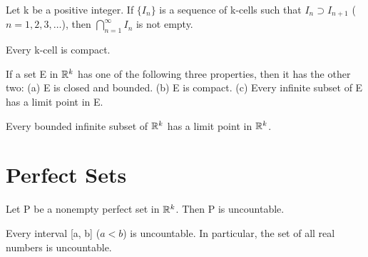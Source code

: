 \begin{theorem} %
  \label{thm:chap2:nested_k_cells}
  Let k be a positive integer. If $\{I_n\}$ is a sequence of k-cells
  such that $I_n \supset I_{n+1}$ ($n=1, 2, 3, \dots$), then
  $\bigcap_{n=1}^\infty I_n$ is not empty.
\end{theorem}

\begin{theorem} %
  \label{thm:chap2:k_cell_compact}
  Every k-cell is compact.
\end{theorem}



\begin{theorem} %
  \label{thm:chap2:heine_borel}
  If a set E in $\mathbb{R}^k$ has one of the following three properties,
  then it has the other two:
  (a) E is closed and bounded.
  (b) E is compact.
  (c) Every infinite subset of E has a limit point in E.
\end{theorem}

\begin{theorem}[Weierstrass] %
  \label{thm:chap2:weierstrass}
  Every bounded infinite subset of $\mathbb{R}^k$ has a limit point in $\mathbb{R}^k$.
\end{theorem}

\section{Perfect Sets}
\label{sec:chap2:perfect_sets}

\begin{theorem} %
  \label{thm:chap2:perfect_sets_uncountable}
  Let P be a nonempty perfect set in $\mathbb{R}^k$. Then P is uncountable.
\end{theorem}

\begin{corollary} %
  \label{cor:chap2:intervals_uncountable}
  Every interval [a, b] ($a<b$) is uncountable. In particular, the
  set of all real numbers is uncountable.
\end{corollary}

